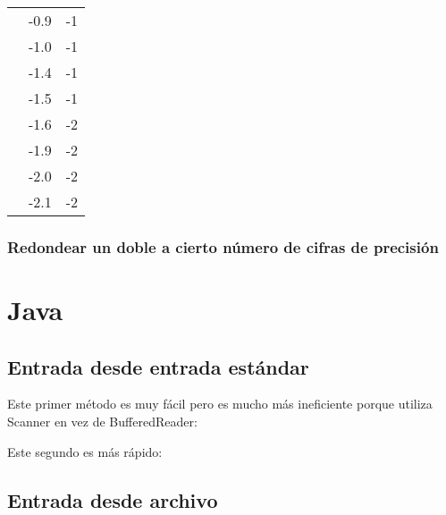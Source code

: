 \documentclass[10pt,letterpaper,twocolumn,twosided]{article}
\newcommand{\codigofuente}[1]{

\dotfill
}
\begin{document}
\begin{center}
\begin{tabular}{| c | c | c | }
                                         & -0.9  & -1 \\ \cline{2-3}
                                         & -1.0 & -1 \\ \cline{2-3}
                                         & -1.4 & -1 \\ \cline{2-3}
                                         & -1.5 & -1 \\ \cline{2-3}
                                         & -1.6 & -2 \\ \cline{2-3}
                                         & -1.9 & -2 \\ \cline{2-3}
                                         & -2.0 & -2 \\ \cline{2-3}
                                         & -2.1 & -2 \\ \cline{2-3}
    \hline
  \end{tabular}
  \renewcommand{\arraystretch}{1}
\end{center}

\subsubsection{Redondear un doble a cierto número de cifras de precisión}


\section{Java}
\subsection{Entrada desde entrada estándar}
Este primer método es muy fácil pero es mucho más ineficiente porque utiliza Scanner en vez de BufferedReader:
\codigofuente{./src/java/io_estandar_easy.java}

\bigskip

Este segundo es más rápido:
\codigofuente{./src/java/io_estandar.java}
\subsection{Entrada desde archivo}
\codigofuente{./src/java/io_file.java}
\end{document}
